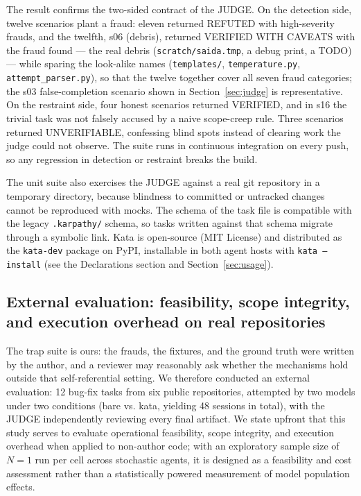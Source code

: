 \documentclass[11pt]{article}
\begin{document}
The result confirms the two-sided contract of the JUDGE. On the detection
side, twelve scenarios plant a fraud: eleven returned REFUTED with
high-severity frauds, and the twelfth, s06 (debris), returned VERIFIED
WITH CAVEATS with the fraud found --- the real debris
(\texttt{scratch/saida.tmp}, a debug print, a TODO) --- while sparing the
look-alike names (\texttt{templates/}, \texttt{temperature.py},
\texttt{attempt\_parser.py}), so that the twelve together cover all seven
fraud categories; the s03 false-completion scenario shown in
Section~\ref{sec:judge} is representative. On the restraint side, four
honest scenarios returned VERIFIED, and in s16 the trivial task was not
falsely accused by a naive scope-creep rule. Three scenarios returned
UNVERIFIABLE, confessing blind spots instead of clearing work the judge
could not observe. The suite runs in continuous integration on every push,
so any regression in detection or restraint breaks the build.

The unit suite also exercises the JUDGE against a real git repository in a
temporary directory, because blindness to committed or untracked changes
cannot be reproduced with mocks. The schema of the task file is compatible
with the legacy \texttt{.karpathy/} schema, so tasks written against that
schema migrate through a symbolic link. Kata is open-source (MIT License)
and distributed as the \texttt{kata-dev} package on PyPI, installable in
both agent hosts with \texttt{kata --install} (see the Declarations
section and Section~\ref{sec:usage}).

\subsection{External evaluation: feasibility, scope integrity, and execution overhead on real repositories}
\label{sec:external-evaluation}

The trap suite is ours: the frauds, the fixtures, and the ground truth
were written by the author, and a reviewer may reasonably ask whether the
mechanisms hold outside that self-referential setting. We therefore conducted
an external evaluation: 12 bug-fix tasks from six public repositories, attempted
by two models under two conditions (bare vs. kata, yielding 48 sessions in
total), with the JUDGE independently reviewing every final artifact. We state
upfront that this study serves to evaluate operational feasibility, scope
integrity, and execution overhead when applied to non-author code; with an
exploratory sample size of $N=1$ run per cell across stochastic agents, it is
designed as a feasibility and cost assessment rather than a statistically
powered measurement of model population effects.
\end{document}
